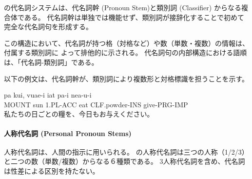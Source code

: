 \langname の代名詞システムは、代名詞幹 (Pronoun Stem)と類別詞 (Classifier) 
からなる複合体である。
代名詞幹は単独では機能せず、類別詞が接辞化することで初めて完全な代名詞句を形成する。

この構造において、代名詞が持つ格（対格など）や数（単数・複数）の情報は、付属する類別詞に
よって排他的に示される。
代名詞句の内部構造における語順は、「代名詞-類別詞」である。

以下の例文は、代名詞幹が、類別詞により複数形と対格標識を担うことを示す。

\begin{exe}
    \ex \gll pa kui, vuae-i iat pa-i nea-u-i \\
        MOUNT sun 1.PL-ACC eat CLF.powder-INS give-PRG-IMP \\
        \glt 私たちの日ごとの糧を、今日もお与えください。
\end{exe}

\paragraph{人称代名詞 (Personal Pronoun Stems)}
人称代名詞は、人間の指示に用いられる。
\langname の人称代名詞は三つの人称（1/2/3）と二つの数（単数/複数）からなる６種類である。
3人称代名詞を含め、代名詞は性差による区別を持たない。

